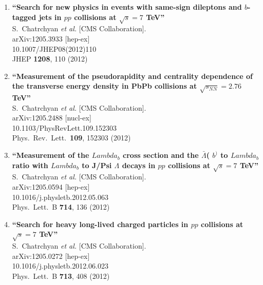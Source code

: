 \documentclass{article}
\begin{document}
\begin{enumerate}
\item%
{\bf ``Search for new physics in events with same-sign dileptons and $b$-tagged jets in $pp$ collisions at $\sqrt{s}=7$ TeV''}
  \\{}S.~Chatrchyan {\it et al.}  [CMS Collaboration].
  \\{}arXiv:1205.3933 [hep-ex]
    \\{}10.1007/JHEP08(2012)110
\\{}JHEP {\bf 1208}, 110 (2012) %


\item%
{\bf ``Measurement of the pseudorapidity and centrality dependence of the transverse energy density in PbPb collisions at $\sqrt{s_{NN}}=2.76$ TeV''}
  \\{}S.~Chatrchyan {\it et al.}  [CMS Collaboration].
  \\{}arXiv:1205.2488 [nucl-ex]
    \\{}10.1103/PhysRevLett.109.152303
\\{}Phys.\ Rev.\ Lett.\  {\bf 109}, 152303 (2012) %


\item%
{\bf ``Measurement of the $Lambda_b$ cross section and the $\bar{\Lambda}$( $b^{)}$ to $Lambda_b$ ratio with $Lambda_b$ to J/Psi $\Lambda$ decays in $pp$ collisions at $\sqrt{s}=7$ TeV''}
  \\{}S.~Chatrchyan {\it et al.}  [CMS Collaboration].
  \\{}arXiv:1205.0594 [hep-ex]
    \\{}10.1016/j.physletb.2012.05.063
\\{}Phys.\ Lett.\ B {\bf 714}, 136 (2012) %


\item%
{\bf ``Search for heavy long-lived charged particles in $pp$ collisions at $\sqrt{s}=7$ TeV''}
  \\{}S.~Chatrchyan {\it et al.}  [CMS Collaboration].
  \\{}arXiv:1205.0272 [hep-ex]
    \\{}10.1016/j.physletb.2012.06.023
\\{}Phys.\ Lett.\ B {\bf 713}, 408 (2012) %



\end{enumerate}
\end{document}

